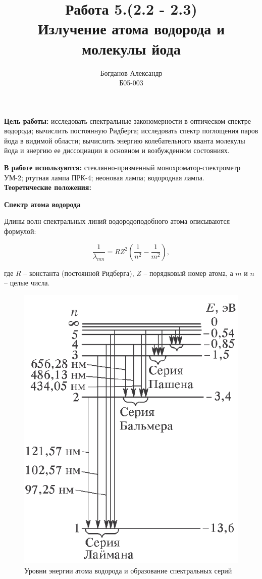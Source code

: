 \documentclass[a4paper, 12pt]{article}%
\author{Богданов Александр \\
	Б05-003}
\title{\textbf{Работа 5.(2.2 - 2.3) \\ 
		Излучение атома водорода и молекулы йода}}
\begin{document}
\maketitle

\textbf{Цель работы:} исследовать спектральные закономерности в оптическом спектре водорода; вычислить постоянную Ридберга; исследовать спектр поглощения паров йода в видимой области; вычислить энергию колебательного кванта молекулы йода и энергию ее диссоциации в основном и возбужденном состояниях.

\textbf{В работе используются:} стеклянно-призменный монохроматор-спектрометр УМ-2; ртутная лампа ПРК-4; неоновая лампа; водородная лампа.\\

\textbf{Теоретические положения:}\\\par

\textbf{Спектр атома водорода}

	Длины волн спектральных линий водородоподобного атома описываются формулой:
	
\[\frac{1}{\lambda_{mn}} = R Z^2 \left( \dfrac{1}{n^2} - \dfrac{1}{m^2}\right),\]

где $R$ -- константа (постоянной Ридберга),  $Z$ -- порядковый номер атома,  а $m$ и $n$ -- целые числа.

	\begin{figure}[h!]
		\centering
		\includegraphics[scale=0.4]{Схема_1.PNG}
		\caption{Уровни энергии атома водорода и образование спектральных серий}
	\end{figure}
\end{document}

